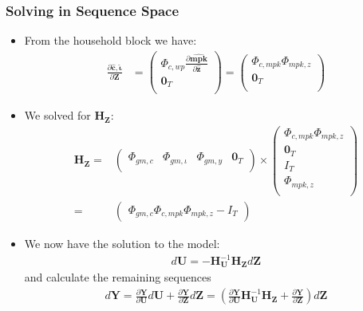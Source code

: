 \documentclass[english,xcolor=svgnames]{beamer}
\begin{document}
	\begin{frame}
		\frametitle{Solving in Sequence Space}
			\begin{itemize}
				\item From the household block we have:
				\begin{align*}
					\frac{\partial \mathbf{\hat{c},\hat{\iota}}}{\partial \mathbf{Z}} &= \begin{pmatrix}
						\Phi_{c,wp}\frac{\partial\mathbf{\hat{mpk}}}{\partial \mathbf{\hat{z}} } \\
						\mathbf{0}_T \\
					\end{pmatrix} = \begin{pmatrix}
						\Phi_{c,mpk}\Phi_{mpk,z} \\
						\mathbf{0}_T \\
					\end{pmatrix}
				\end{align*}
				\item We solved for $\mathbf{H}_{\mathbf{Z}}$:
				\begin{align*}
					\mathbf{H}_{\mathbf{Z}} =&\begin{pmatrix}
						\Phi_{gm,c} & \Phi_{gm,\iota} & \Phi_{gm,y}  & \mathbf{0}_T \\ 
					\end{pmatrix}  \times \begin{pmatrix}
						\Phi_{c,mpk}\Phi_{mpk,z} \\
						\mathbf{0}_T \\
						I_T  \\
						\Phi_{mpk,z}  \\
					\end{pmatrix} \\
					=& 
					\begin{pmatrix}
						\Phi_{gm,c}\Phi_{c,mpk}\Phi_{mpk,z} - I_T
					\end{pmatrix}
				\end{align*}
				\item We now have the solution to the model:
					\begin{align*}
						d\mathbf{U} = -\mathbf{H}_{\mathbf{U}}^{-1}\mathbf{H}_{\mathbf{Z}}d\mathbf{Z}
					\end{align*}
					and calculate the remaining sequences
					\begin{align*}
						d\mathbf{Y} = \frac{\partial \mathbf{Y}}{\partial \mathbf{U}}d\mathbf{U} +  \frac{\partial \mathbf{Y}}{\partial \mathbf{Z}}d\mathbf{Z} = (\frac{\partial \mathbf{Y}}{\partial \mathbf{U}}\mathbf{H}_{\mathbf{U}}^{-1}\mathbf{H}_{\mathbf{Z}} +  \frac{\partial \mathbf{Y}}{\partial \mathbf{Z}})d\mathbf{Z}
					\end{align*}
			\end{itemize}
	\end{frame}
	
\end{document}

